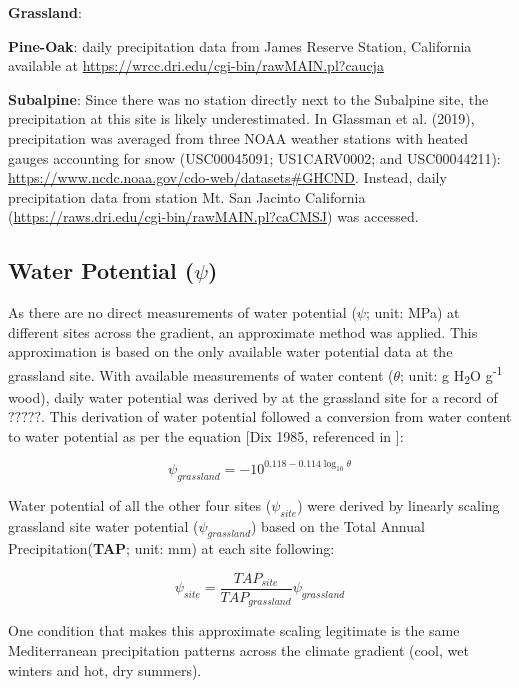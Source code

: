 \documentclass[letterpaper, 10pt]{article}
\begin{document}
\textbf{Grassland}:

\textbf{Pine-Oak}: daily precipitation data from James Reserve Station, California available at \url{https://wrcc.dri.edu/cgi-bin/rawMAIN.pl?caucja}

\textbf{Subalpine}: Since there was no station directly next to the Subalpine site, the precipitation at this site is likely underestimated. In Glassman et al. (2019), precipitation was averaged from three NOAA weather stations with heated gauges accounting for snow (USC00045091; US1CARV0002; and USC00044211): \url{https://www.ncdc.noaa.gov/cdo-web/datasets#GHCND}. Instead, daily precipitation data from station Mt. San Jacinto California (\url{https://raws.dri.edu/cgi-bin/rawMAIN.pl?caCMSJ}) was accessed.


\subsection{Water Potential ($\psi$)}
As there are no direct measurements of water potential ($\psi$; unit: MPa) at different sites across the gradient, an approximate method was applied. This approximation is based on the only available water potential data at the grassland site. With available measurements of water content ($\theta$; unit: g H\textsubscript{2}O g\textsuperscript{-1} wood), daily water potential was derived by \citet{allison2017consequences} at the grassland site for a record of $?????$. This derivation of water potential followed a conversion from water content to water potential as per the equation [Dix 1985, referenced in \citet{allison2017consequences}]:

\begin{equation}
  \psi_{grassland} = -10^{0.118-0.114\log_{10} \theta}
\end{equation}

Water potential of all the other four sites ($\psi_{site}$) were derived by linearly scaling grassland site water potential ($\psi_{grassland}$) based on the Total Annual Precipitation(\textbf{TAP}; unit: mm) at each site following:

\begin{equation}
  \psi_{site} = \frac{TAP_{site}}{TAP_{grassland}} \psi_{grassland}
\end{equation}

One condition that makes this approximate scaling legitimate is the same Mediterranean precipitation patterns across the climate gradient (cool, wet winters and hot, dry summers).
\end{document}
